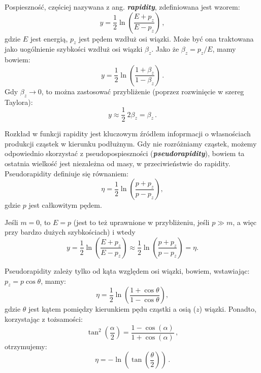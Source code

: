 \documentclass[a4paper,12pt]{article}
\begin{document}
Pospieszność, częściej nazywana z ang. \textbf{\textit{rapidity}}, zdefiniowana jest wzorem: 
\begin{equation} \label{eq:rapid} 
y = \frac{1}{2} \ln \left( \frac{E + p_z}{E - p_z} \right)\,,
\end{equation}
gdzie $E$ jest energią, $p_z$ jest pędem wzdłuż osi wiązki. Może być ona traktowana jako uogólnienie szybkości wzdłuż osi wiązki $\beta_z$. Jako że $\beta_z = p_z / E$, mamy bowiem:
\begin{equation} \label{eq:rapid2}
y = \frac{1}{2} \ln \left( \frac{1 + \beta_z}{1 - \beta_z} \right)\,. 
\end{equation}
Gdy $\beta_z \to 0$, to można zastosować przybliżenie (poprzez rozwinięcie w szereg Taylora):
\begin{equation} \label{eq:rapid3}
y \approx \frac{1}{2} \ 2\beta_z = \beta_z \,.
\end{equation}

Rozkład w funkcji rapidity jest kluczowym źródłem infoprmacji o własnościach produkcji cząstek w kierunku podłużnym. Gdy nie rozróżniamy cząstek, możemy odpowiednio skorzystać z pseudopospieszności (\textbf{\textit{pseudorapidity}}), bowiem ta ostatnia wielkość jest niezależna od masy, w przeciwieństwie do rapidity. Pseudorapidity definiuje się równaniem:
\begin{equation} \label{eq:pseudorap}
\eta = \frac{1}{2} \ln \left( \frac{p + p_z}{p - p_z} \right),
\end{equation}
gdzie $p$ jest całkowitym pędem.

Jeśli $m = 0$, to $E = p$ (jest to też uprawnione w przybliżeniu, jeśli $p \gg m$, a więc przy bardzo dużych szybkościach) i wtedy
\begin{equation} \label{eq:rap-pseudorap}
 y = \frac{1}{2} \ln \left( \frac{E + p_z}{E - p_z} \right) \approx \frac{1}{2} \ln \left( \frac{p + p_z}{p - p_z} \right) = \eta. 
 \end{equation}
 
Pseudorapidity zależy tylko od kąta względem osi wiązki, bowiem, wstawiając: $p_z = p \cos\theta$, mamy:
\begin{equation} \label{eq:pseudo1}
 \eta = \frac{1}{2} \ln \left( \frac{1 + \cos\theta}{1 - \cos\theta} \right) ,
 \end{equation}
gdzie $\theta$ jest kątem pomiędzy kierunkiem pędu cząstki a osią ($z$) wiązki. Ponadto, korzystając z tożsamości:
\begin{equation} \label{eq:tansq}
 \tan^2 \left( \frac{\alpha}{2}  \right) = \frac{1 - \cos(\alpha)}{1 + \cos(\alpha)}\,,
 \end{equation}
otrzymujemy:
\begin{equation} \label{eq:pseudorap2}
\eta = - \ln \left( \tan \left( \frac{\theta}{2} \right) \right)\,.
\end{equation}
\end{document}
